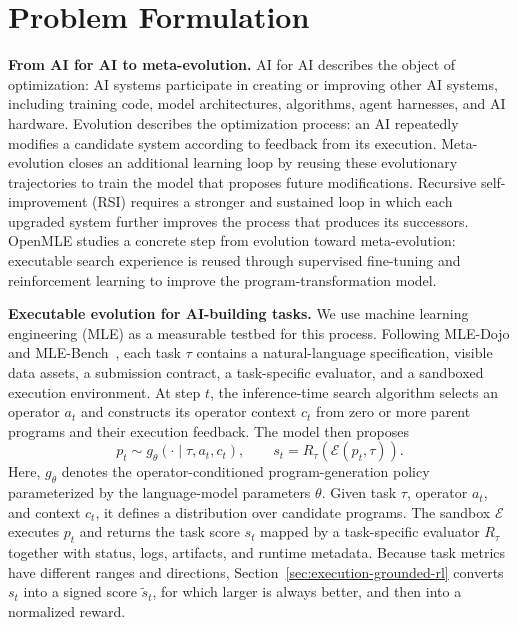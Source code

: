 \section{Problem Formulation}
\label{sec:problem-setting}



\textbf{From AI for AI to meta-evolution.}
AI for AI describes the object of optimization: AI systems participate in creating or improving other AI systems, including training code, model architectures, algorithms, agent harnesses, and AI hardware.
Evolution describes the optimization process: an AI repeatedly modifies a candidate system according to feedback from its execution.
Meta-evolution closes an additional learning loop by reusing these evolutionary trajectories to train the model that proposes future modifications.
Recursive self-improvement (RSI) requires a stronger and sustained loop in which each upgraded system further improves the process that produces its successors.
OpenMLE studies a concrete step from evolution toward meta-evolution: executable search experience is reused through supervised fine-tuning and reinforcement learning to improve the program-transformation model.

\textbf{Executable evolution for AI-building tasks.}
We use machine learning engineering (MLE) as a measurable testbed for this process.
Following MLE-Dojo and MLE-Bench~\citep{qiang2025mledojo,chan2024mlebench}, each task $\tau$ contains a natural-language specification, visible data assets, a submission contract, a task-specific evaluator, and a sandboxed execution environment.
At step $t$, the inference-time search algorithm selects an operator
$a_t$ and constructs its operator context $c_t$ from zero or more parent
programs and their execution feedback.
The model then proposes
\[
p_t \sim g_\theta(\cdot\mid\tau,a_t,c_t),
\qquad
s_t=R_\tau(\mathcal{E}(p_t,\tau)).
\]
Here, $g_\theta$ denotes the operator-conditioned program-generation
policy parameterized by the language-model parameters $\theta$.
Given task $\tau$, operator $a_t$, and context $c_t$, it defines a
distribution over candidate programs.
The sandbox $\mathcal{E}$ executes $p_t$ and returns the task score $s_t$ mapped by a task-specific evaluator $R_\tau$ together
with status, logs, artifacts, and runtime metadata.
Because task metrics have different ranges and directions, Section~\ref{sec:execution-grounded-rl} converts $s_t$ into a signed score $\tilde{s}_t$, for which larger is always better, and then into a normalized reward.

